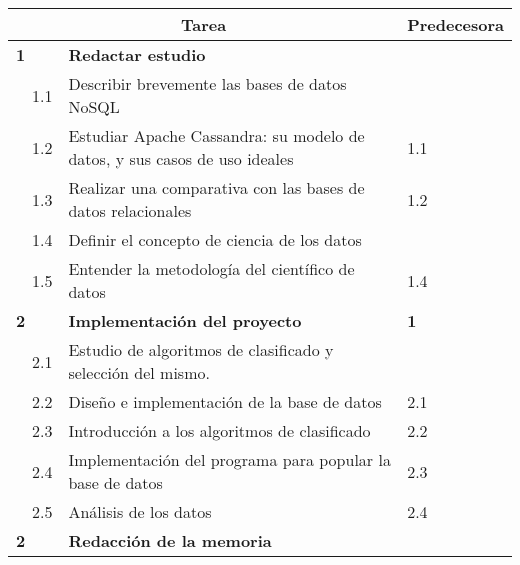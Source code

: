 \begin{table}[!htb]
\centering
\begin{tabular}{l|l|l|l|l|l|}
\hline
\multicolumn{5}{|c|}{Tarea}                                                                                                       & Predecesora \\ \hline
\multicolumn{2}{|l|}{\textbf{1}} & \multicolumn{3}{l|}{\textbf{Redactar  estudio}}                                                &             \\ \hline
              & 1.1              & \multicolumn{3}{l|}{Describir brevemente las bases de datos NoSQL}                             &             \\ \cline{2-6} 
              & 1.2              & \multicolumn{3}{l|}{Estudiar Apache Cassandra: su modelo de datos, y sus casos de uso ideales} & 1.1         \\ \cline{2-6} 
              & 1.3              & \multicolumn{3}{l|}{Realizar una comparativa con las bases de datos relacionales}              & 1.2         \\ \cline{2-6} 
              & 1.4              & \multicolumn{3}{l|}{Definir el concepto de ciencia de los datos}                               &             \\ \cline{2-6} 
              & 1.5              & \multicolumn{3}{l|}{Entender la metodología del científico de datos}                           & 1.4        \\ \hline

\multicolumn{2}{|l|}{\textbf{2}} & \multicolumn{3}{l|}{\textbf{Implementación del proyecto}}                                      & \textbf{1}  \\ \hline
              & 2.1              & \multicolumn{3}{l|}{Estudio de algoritmos de clasificado y selección del mismo.}               &             \\ \cline{2-6} 
              & 2.2              & \multicolumn{3}{l|}{Diseño e implementación de la base de datos}                               & 2.1         \\ \cline{2-6} 
              & 2.3              & \multicolumn{3}{l|}{Introducción a los algoritmos de clasificado}                              & 2.2         \\ \cline{2-6} 
              & 2.4              & \multicolumn{3}{l|}{Implementación del programa para popular la base de datos}                 & 2.3         \\ \cline{2-6} 
              & 2.5              & \multicolumn{3}{l|}{Análisis de los datos}                                                     & 2.4         \\ \hline
\multicolumn{2}{|l|}{\textbf{2}} & \multicolumn{3}{l|}{\textbf{Redacción de la memoria}}                                          &             \\ \hline
\end{tabular}
\end{table}

